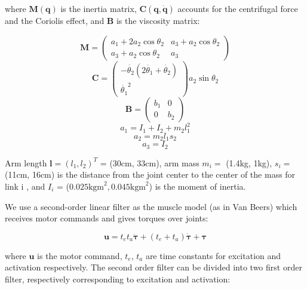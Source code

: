 where $\bm{M}(\bm{q})$ is the inertia matrix, $\bm{C}(\bm{q}, \dot{\bm{q}})$ accounts for the centrifugal force and the Coriolis effect, and $\bm{B}$ is the viscosity matrix:

\begin{equation}
\bm{M} = \left( \begin{matrix} a_1 + 2a_2\cos\theta_2  &  a_3 + a_2 \cos\theta_2 \\
a_3 + a_2 \cos\theta_2   &  a_3
\end{matrix}\right)
\end{equation}
\begin{equation}
\bm{C} = \left( \begin{matrix} -\dot{\theta_2}(2\dot{\theta_1}+\dot{\theta_2}) \\
\dot{\theta_1}^2	\end{matrix} \right)
a_2\sin{\theta_2}
\end{equation}
\begin{equation}
\bm{B} = \left( \begin{matrix} b_1  & 0 \\ 0 & b_2 \end{matrix} \right)
\end{equation}
\begin{equation}
a_1 = I_1 + I_2 + m_2 l_1^2
\end{equation}
\begin{equation}
a_2 = m_2 l_1 s_2
\end{equation}
\begin{equation}
a_3 = I_2
\end{equation}

Arm length $\bm{l} = (l_1, l_2)^T$ = (30cm, 33cm), arm mass $m_i =$ (1.4kg, 1kg), $s_i=$ (11cm, 16cm) is the distance from the joint center to the center of the mass for link i , and $I_i$ = ($0.025\text{kgm}^2, 0.045\text{kgm}^2$) is the moment of inertia.

We use a second-order linear filter as the muscle model (as in Van Beers) which receives motor commands and gives torques over joints:

\begin{equation}
\bm{u} = t_et_a\ddot{\bm{\tau}} + (t_e+t_a)\dot{\bm{\tau}} +\bm{\tau}
\end{equation}

where $\bm{u}$ is the motor command, $t_e$, $t_a$ are time constants for excitation and activation respectively. 
The second order filter can be divided into two first order filter, respectively corresponding to excitation and activation:

